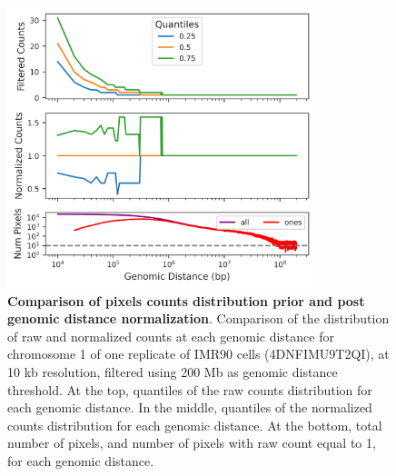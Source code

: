 \begin{figure}[ht]
  \centering
  \includegraphics[width=0.8\textwidth]{normalization_stats.png}
  \caption{\textbf{Comparison of pixels counts distribution prior and post genomic distance normalization}. Comparison of the distribution of raw and normalized counts at each genomic distance for chromosome 1 of one replicate of IMR90 cells (4DNFIMU9T2QI), at 10 kb resolution, filtered using 200 Mb as genomic distance threshold. At the top, quantiles of the raw counts distribution for each genomic distance. In the middle, quantiles of the normalized counts distribution for each genomic distance. At the bottom, total number of pixels, and number of pixels with raw count equal to 1, for each genomic distance.}
  \label{fig:normstats}
\end{figure}

